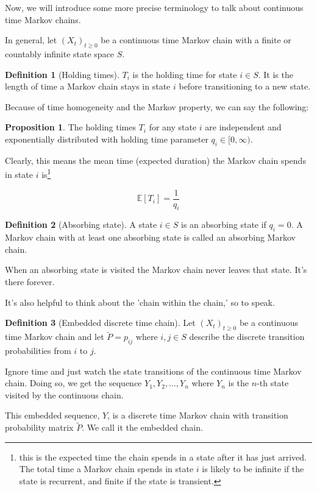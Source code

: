 \documentclass[12pt]{article}
\theoremstyle{definition}
\newtheorem{definition}{Definition}[section]
\newtheorem{proposition}{Proposition}[section]
\begin{document}
Now, we will introduce some more precise terminology to talk about continuous time Markov chains.

In general, let $(X_t)_{t \geq 0}$ be a continuous time Markov chain with a finite or countably infinite state space $S$.

\begin{definition}[Holding times]
  $T_i$ is the holding time for state $i \in S$. It is the length of time a Markov chain stays in state $i$ before transitioning to a new state.
\end{definition}

Because of time homogeneity and the Markov property, we can say the following:

\begin{proposition}
  The holding times $T_i$ for any state $i$ are independent and exponentially distributed with holding time parameter $q_i \in [0, \infty)$.
\end{proposition}

Clearly, this means the mean time (expected duration) the Markov chain spends in state $i$ is\footnote{this is the expected time the chain spends in a state after it has just arrived. The total time a Markov chain spends in state $i$ is likely to be infinite if the state is recurrent, and finite if the state is transient.}

$$
\mathbb{E}[T_i] = \frac{1}{q_i}
$$

\begin{definition}[Absorbing state]
  A state $i \in S$ is an absorbing state if $q_i = 0$. A Markov chain with at least one absorbing state is called an absorbing Markov chain.
\end{definition}

When an absorbing state is visited the Markov chain never leaves that state. It's there forever.

It's also helpful to think about the 'chain within the chain,' so to speak.

\begin{definition}[Embedded discrete time chain]
  Let $(X_t)_{t \geq 0}$ be a continuous time Markov chain and let $\widetilde{P} = p_{ij}$ where $i,j \in S$ describe the discrete transition probabilities from $i$ to $j$.

  Ignore time and just watch the state transitions of the continuous time Markov chain. Doing so, we get the sequence $Y_1, Y_2, \dots, Y_n$ where $Y_n$ is the $n$-th state visited by the continuous chain.

  This embedded sequence, $Y$, is a discrete time Markov chain with transition probability matrix $\widetilde{P}$. We call it the embedded chain.
\end{definition}
\end{document}

